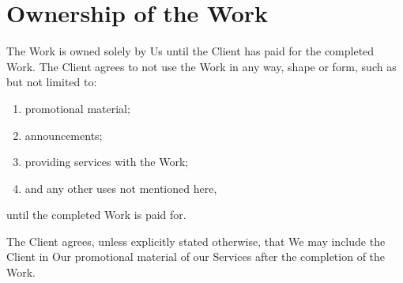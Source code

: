 \documentclass{article}
\begin{document}
\section{Ownership of the Work}
The Work is owned solely by Us until the Client has paid for the completed Work. The Client agrees to not use the Work in any way, shape or form, such as but not limited to:
\begin{enumerate}
    \item promotional material;
    \item announcements;
    \item providing services with the Work;
    \item and any other uses not mentioned here,
\end{enumerate}
until the completed Work is paid for.

The Client agrees, unless explicitly stated otherwise, that We may include the Client in Our promotional material of our Services after the completion of the Work.
\end{document}

